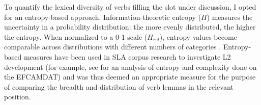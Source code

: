 To quantify the lexical diversity of verbs filling the slot under discussion, I opted for an entropy-based approach. 
Information-theoretic entropy ($H$) measures the uncertainty in a probability distribution: the more evenly distributed, the higher the entropy.
When normalized to a 0-1 scale ($H_{rel}$), entropy values become comparable across distributions with different numbers of categories \citep{griesStatisticalMeasuresUsageBased2015}.
Entropy-based measures have been used in SLA corpus research to investigate L2 development (for example, see \cite{kunEntropy2021} for an analysis of entropy and complexity done on the EFCAMDAT) and was thus deemed an appropriate measure for the purpose of comparing the breadth and distribution of verb lemmas in the relevant position. 
